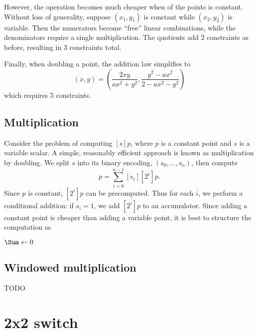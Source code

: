 \documentclass{article}
\begin{document}
However, the operation becomes much cheaper when of the points is constant. Without loss of generality, suppose $(x_1, y_1)$ is constant while $(x_2, y_2)$ is variable. Then the numerators become ``free'' linear combinations, while the denominators require a single multiplication. The quotients add 2 constraints as before, resulting in 3 constraints total.

Finally, when doubling a point, the addition law simplifies to
\begin{equation}
  [2] (x, y) = \left( \frac{2 x y}{a x^2 + y^2}, \frac{y^2 - a x^2}{2 - a x^2 - y^2} \right)
\end{equation}
which requires 5 constraints.


\subsection{Multiplication}

Consider the problem of computing $[s] p$, where $p$ is a constant point and $s$ is a variable scalar. A simple, reasonably efficient approach is known as multiplication by doubling. We split $s$ into its binary encoding, $(s_0, \dots, s_n)$, then compute
\begin{equation}
  [s] p = \sum_{i=0}^{n-1} [s_i] [2^i] p.
\end{equation}
Since $p$ is constant, $[2^i] p$ can be precomputed. Thus for each $i$, we perform a conditional addition: if $s_i = 1$, we add $[2^i] p$ to an accumulator. Since adding a constant point is cheaper than adding a variable point, it is best to structure the computation as

\begin{algorithm}[H]
  $\Sum \leftarrow 0$\;
  \Return \Sum\;
\end{algorithm}


\subsection{Windowed multiplication}

TODO


\section{2x2 switch}
\end{document}
